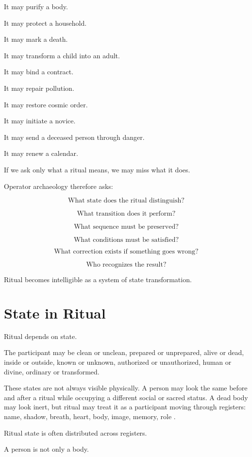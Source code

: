 \documentclass[11pt]{book}
\begin{document}
It may purify a body.

It may protect a household.

It may mark a death.

It may transform a child into an adult.

It may bind a contract.

It may repair pollution.

It may restore cosmic order.

It may initiate a novice.

It may send a deceased person through danger.

It may renew a calendar.

If we ask only what a ritual means, we may miss what it does.

Operator archaeology therefore asks:

\[
\text{What state does the ritual distinguish?}
\]

\[
\text{What transition does it perform?}
\]

\[
\text{What sequence must be preserved?}
\]

\[
\text{What conditions must be satisfied?}
\]

\[
\text{What correction exists if something goes wrong?}
\]

\[
\text{Who recognizes the result?}
\]

Ritual becomes intelligible as a system of state transformation.

\section{State in Ritual}

Ritual depends on state.

The participant may be clean or unclean, prepared or unprepared, alive or dead, inside or outside, known or unknown, authorized or unauthorized, human or divine, ordinary or transformed.

These states are not always visible physically. A person may look the same before and after a ritual while occupying a different social or sacred status. A dead body may look inert, but ritual may treat it as a participant moving through registers: name, shadow, breath, heart, body, image, memory, role \cite{Assmann2005DeathSalvation,Assmann2011CulturalMemory,Allen1974BookDead}.

Ritual state is often distributed across registers.

A person is not only a body.
\end{document}
